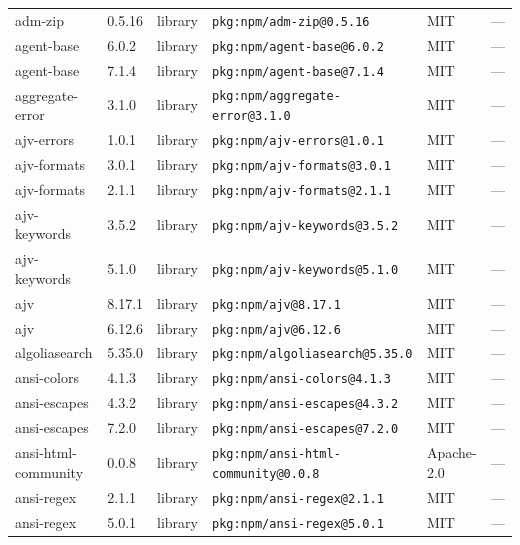 \documentclass[11pt,a4paper]{article}
\begin{document}
\begin{longtable}{|p{4cm}|p{2cm}|p{1.6cm}|p{5cm}|p{1.5cm}|p{3.5cm}|}
\raggedright adm-zip & 0.5.16 & library & \small\texttt{pkg:npm/adm-zip@0.5.16} & MIT & \small — \\
\raggedright agent-base & 6.0.2 & library & \small\texttt{pkg:npm/agent-base@6.0.2} & MIT & \small — \\
\raggedright agent-base & 7.1.4 & library & \small\texttt{pkg:npm/agent-base@7.1.4} & MIT & \small — \\
\raggedright aggregate-error & 3.1.0 & library & \small\texttt{pkg:npm/aggregate-error@3.1.0} & MIT & \small — \\
\raggedright ajv-errors & 1.0.1 & library & \small\texttt{pkg:npm/ajv-errors@1.0.1} & MIT & \small — \\
\raggedright ajv-formats & 3.0.1 & library & \small\texttt{pkg:npm/ajv-formats@3.0.1} & MIT & \small — \\
\raggedright ajv-formats & 2.1.1 & library & \small\texttt{pkg:npm/ajv-formats@2.1.1} & MIT & \small — \\
\raggedright ajv-keywords & 3.5.2 & library & \small\texttt{pkg:npm/ajv-keywords@3.5.2} & MIT & \small — \\
\raggedright ajv-keywords & 5.1.0 & library & \small\texttt{pkg:npm/ajv-keywords@5.1.0} & MIT & \small — \\
\raggedright ajv & 8.17.1 & library & \small\texttt{pkg:npm/ajv@8.17.1} & MIT & \small — \\
\raggedright ajv & 6.12.6 & library & \small\texttt{pkg:npm/ajv@6.12.6} & MIT & \small — \\
\raggedright algoliasearch & 5.35.0 & library & \small\texttt{pkg:npm/algoliasearch@5.35.0} & MIT & \small — \\
\raggedright ansi-colors & 4.1.3 & library & \small\texttt{pkg:npm/ansi-colors@4.1.3} & MIT & \small — \\
\raggedright ansi-escapes & 4.3.2 & library & \small\texttt{pkg:npm/ansi-escapes@4.3.2} & MIT & \small — \\
\raggedright ansi-escapes & 7.2.0 & library & \small\texttt{pkg:npm/ansi-escapes@7.2.0} & MIT & \small — \\
\raggedright ansi-html-community & 0.0.8 & library & \small\texttt{pkg:npm/ansi-html-community@0.0.8} & Apache-2.0 & \small — \\
\raggedright ansi-regex & 2.1.1 & library & \small\texttt{pkg:npm/ansi-regex@2.1.1} & MIT & \small — \\
\raggedright ansi-regex & 5.0.1 & library & \small\texttt{pkg:npm/ansi-regex@5.0.1} & MIT & \small — \\

\end{longtable}
\end{document}
